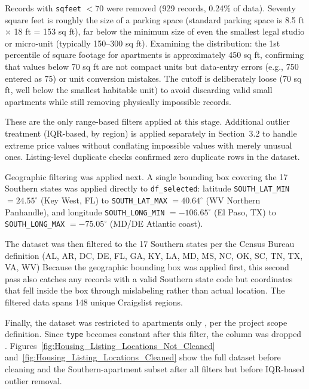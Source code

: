 Records with \texttt{sqfeet} $< 70$ were removed (929 records, 0.24\% of data). Seventy square feet is roughly the size of a parking space (standard parking space is 8.5 ft $\times$ 18 ft = 153 sq ft), far below the minimum size of even the smallest legal studio or micro-unit (typically 150--300 sq ft). Examining the distribution: the 1st percentile of square footage for apartments is approximately 450 sq ft, confirming that values below 70 sq ft are not compact units but data-entry errors (e.g., 750 entered as 75) or unit conversion mistakes. The cutoff is deliberately loose (70 sq ft, well below the smallest habitable unit) to avoid discarding valid small apartments while still removing physically impossible records.

These are the only range-based filters applied at this stage. Additional outlier treatment (IQR-based, by region) is applied separately in Section~3.2 to handle extreme price values without conflating impossible values with merely unusual ones. Listing-level duplicate checks confirmed zero duplicate rows in the dataset.

\noindent
Geographic filtering was applied next. %
A single bounding box covering the 17 Southern states was applied directly to \texttt{df\_selected}: latitude \texttt{SOUTH\_LAT\_MIN} $= 24.55^\circ$ (Key West, FL) to \texttt{SOUTH\_LAT\_MAX} $= 40.64^\circ$ (WV Northern Panhandle), and longitude \texttt{SOUTH\_LONG\_MIN} $= -106.65^\circ$ (El Paso, TX) to \texttt{SOUTH\_LONG\_MAX} $= -75.05^\circ$ (MD/DE Atlantic coast). %

\noindent
The dataset was then filtered to the 17 Southern states per the Census Bureau definition (AL, AR, DC, DE, FL, GA, KY, LA, MD, MS, NC, OK, SC, TN, TX, VA, WV)%
Because the geographic bounding box was applied first, this second pass also catches any records with a valid Southern state code but coordinates that fell inside the box through mislabeling rather than actual location. The filtered data spans 148 unique Craigslist regions.

\noindent
Finally, the dataset was restricted to apartments only %
, per the project scope definition. Since \texttt{type} becomes constant after this filter, the column was dropped%
. Figures~\ref{fig:Housing_Listing_Locations_Not_Cleaned} and~\ref{fig:Housing_Listing_Locations_Cleaned} show the full dataset before cleaning and the Southern-apartment subset after all filters but before IQR-based outlier removal.

